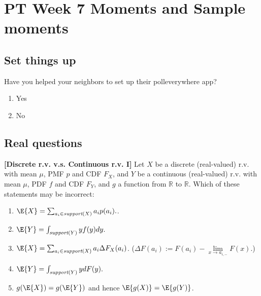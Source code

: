 \documentclass[poll_tutorial_format]{subfiles}
\begin{document}
	\maketitle
	\setcounter{section}{6}
	\section{PT Week 7 Moments and Sample moments}
	
	\subsection{Set things up}
	\label{sec:set-things-up}
	
	
	
	\setcounter{theorem}{-1}
	\begin{exercise}
		Have you helped your neighbors to set up their polleverywhere app? 
		\begin{enumerate}
			\item Yes
			\item No
		\end{enumerate}
	\end{exercise}
	
	\subsection{Real questions}
	\label{sec:start-real-questions pt week 5}
	
	
	
		\begin{exercise}
			\textbf{[Discrete r.v. v.s. Continuous r.v. I]}
				Let $X$ be a discrete (real-valued) r.v. with mean $\mu$, PMF $p$ and CDF $F_X$, and $Y$ be a continuous (real-valued) r.v. with mean $\mu$, PDF $f$ and CDF $F_Y$, and $g$ a function from $\mathbb{R}$ to $\mathbb{R}$.
				Which of these statements may be incorrect: 
				\begin{enumerate}
						\item $\E{X}=\sum_{a_i \in \textit{support}(X) } a_i p(a_i).$.
						\item $\E{Y} = \int_{\textit{support}(Y) } yf(y)dy. $
						\item $\E{X}=\sum_{a_i \in \textit{support}(X) } a_i \Delta F_X(a_i)$. ($\Delta F(a_i):=F(a_i)-\lim\limits_{x\rightarrow a_{i,-}}F(x)$.)
						\item $\E{Y} = \int_{\textit{support}(Y) } ydF(y).$
						\item $g(\E{X})=g(\E{Y})$ and hence  $\E{g(X)}=\E{g(Y)}$. 
					\end{enumerate}
			\end{exercise}
	
\end{document}
